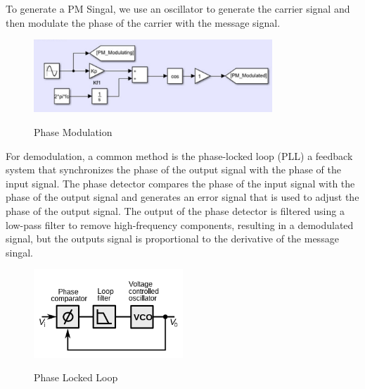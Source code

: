 \documentclass[12pt]{article}
\begin{document}
To generate a PM Singal, we use an oscillator to generate the carrier signal and then modulate the phase of the carrier with the message signal. 
\begin{figure}[H]
    \centering
    \includegraphics[width=0.8\textwidth]{assets/mod.png}
    \caption{Phase Modulation}
    \cite{Prelab}
\end{figure}

For demodulation, a common method is the phase-locked loop (PLL) a feedback system that synchronizes the phase of the output signal with the phase of the input signal. The phase detector compares the phase of the input signal with the phase of the output signal and generates an error signal that is used to adjust the phase of the output signal. The output of the phase detector is filtered using a low-pass filter to remove high-frequency components, resulting in a demodulated signal, but the outputs signal is proportional to the derivative of the message singal.
\begin{figure}[H]
    \centering
    \includegraphics[width=0.5\textwidth]{assets/img/PLL.png}
    \caption{Phase Locked Loop}
    \cite{wikipedia_pll}
\end{figure}
\end{document}
